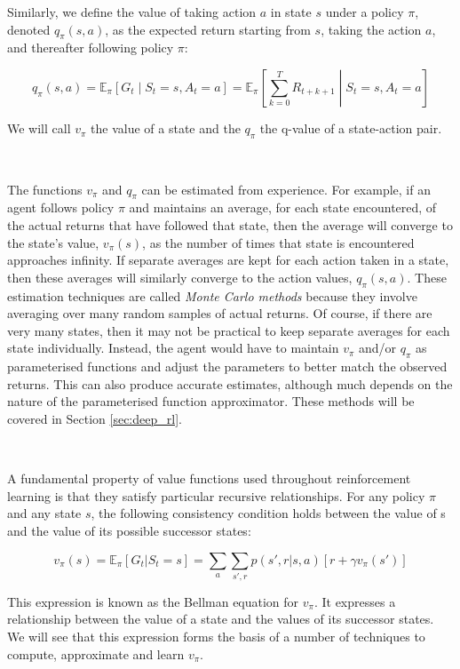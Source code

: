 \documentclass{article}
\begin{document}
Similarly, we define the value of taking action $a$ in state $s$ under a policy $\pi$, denoted $q_\pi(s, a)$, as the expected return starting from $s$, taking the action $a$, and thereafter following policy $\pi$:

\begin{equation}
	q_\pi(s, a) = \mathbb{E}_\pi \left[ G_t  \middle| S_t = s, A_t = a\right] = \mathbb{E}_\pi \left[ \sum_{k=0}^T R_{t + k + 1} \middle| S_t = s, A_t = a\right]
\end{equation}

We will call $v_\pi$ the value of a state and the $q_\pi$ the q-value of a state-action pair.

\

The functions $v_\pi$ and $q_\pi$ can be estimated from experience. For example, if an agent follows policy $\pi$ and maintains an average, for each state encountered, of the actual returns that have followed that state, then the average will converge to the state’s value, $v_\pi(s)$, as the number of times that state is encountered approaches infinity. If separate averages are kept for each action taken in a state, then these averages will similarly converge to the action values, $q_\pi(s, a)$. These estimation techniques are called \textit{Monte Carlo methods} because they involve averaging over many random samples of actual returns. Of course, if there are very many states, then it may not be practical to keep separate averages for each state individually. Instead, the agent would have to maintain $v_\pi$ and/or $q_\pi$ as parameterised functions and adjust the parameters to better match the observed returns. This can also produce accurate estimates, although much depends on the nature of the parameterised function approximator. These methods will be covered in Section \ref{sec:deep_rl}.

\

A fundamental property of value functions used throughout reinforcement learning is that they satisfy particular recursive relationships. For any policy $\pi$ and any state $s$, the following consistency condition holds between the value of s and the value of its possible successor states:

\begin{equation}\label{eq:bellman_equation}
	v_\pi(s) = \mathbb{E}_\pi [ G_t | S_t = s ] = \sum_a \sum_{s', r} p(s', r | s, a) \left[ r + \gamma v_\pi(s') \right]
\end{equation}

This expression is known as the Bellman equation for $v_\pi$. It expresses a relationship between the value of a state and the values of its successor states. We will see that this expression forms the basis of a number of techniques to compute, approximate and learn $v_\pi$.
\end{document}
